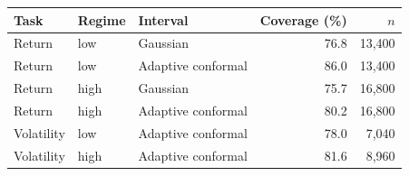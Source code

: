 \begin{tabular}{lllrr}
\toprule
Task & Regime & Interval & Coverage (\%) & $n$ \\
\midrule
Return & low & Gaussian & 76.8 & 13,400 \\
Return & low & Adaptive conformal & 86.0 & 13,400 \\
Return & high & Gaussian & 75.7 & 16,800 \\
Return & high & Adaptive conformal & 80.2 & 16,800 \\
Volatility & low & Adaptive conformal & 78.0 & 7,040 \\
Volatility & high & Adaptive conformal & 81.6 & 8,960 \\
\bottomrule
\end{tabular}
